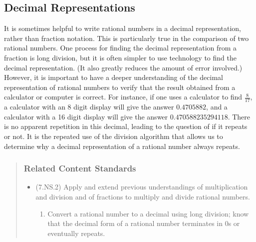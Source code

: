 \documentclass[
]{book}
\providecommand{\tightlist}{%
  \setlength{\itemsep}{0pt}\setlength{\parskip}{0pt}}
\theoremstyle{definition}
\theoremstyle{definition}
\theoremstyle{definition}
\theoremstyle{remark}
\begin{document}
\hypertarget{decimal-representations}{%
\subsection{Decimal Representations}\label{decimal-representations}}

It is sometimes helpful to write rational numbers in a decimal representation, rather than fraction notation. This is particularly true in the comparison of two rational numbers. One process for finding the decimal representation from a fraction is long division, but it is often simpler to use technology to find the decimal representation. (It also greatly reduces the amount of error involved.) However, it is important to have a deeper understanding of the decimal representation of rational numbers to verify that the result obtained from a calculator or computer is correct. For instance, if one uses a calculator to find \(\frac{8}{17}\), a calculator with an 8 digit display will give the answer \(0.4705882\), and a calculator with a 16 digit display will give the answer \(0.470588235294118\). There is no apparent repetition in this decimal, leading to the question of if it repeats or not. It is the repeated use of the division algorithm that allows us to determine why a decimal representation of a rational number always repeats.

\begin{quote}
\hypertarget{related-content-standards-11}{%
\subsubsection*{Related Content Standards}\label{related-content-standards-11}}

\begin{itemize}
\tightlist
\item
  (7.NS.2) Apply and extend previous understandings of multiplication and division and of fractions to multiply and divide rational numbers.

  \begin{enumerate}
  \def\labelenumi{\alph{enumi}.}
  \setcounter{enumi}{3}
  \tightlist
  \item
    Convert a rational number to a decimal using long division; know that the decimal form of a rational number terminates in 0s or eventually repeats.
  \end{enumerate}
\end{itemize}
\end{quote}
\end{document}
